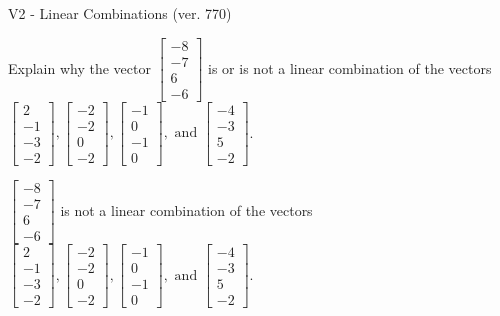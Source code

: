\begin{exercise}
  \begin{exerciseTitle}V2 - Linear Combinations (ver. 770)\end{exerciseTitle}
  \begin{exerciseStatement}
    Explain why the vector \(\left[\begin{array}{c}
-8 \\
-7 \\
6 \\
-6
\end{array}\right]\)  is or is not a linear 
	combination of the vectors \(\left[\begin{array}{c}
2 \\
-1 \\
-3 \\
-2
\end{array}\right] , \left[\begin{array}{c}
-2 \\
-2 \\
0 \\
-2
\end{array}\right] , \left[\begin{array}{c}
-1 \\
0 \\
-1 \\
0
\end{array}\right] , \text{ and } \left[\begin{array}{c}
-4 \\
-3 \\
5 \\
-2
\end{array}\right]\).
	


  \end{exerciseStatement}
  \begin{exerciseAnswer}
   \(\left[\begin{array}{c}
-8 \\
-7 \\
6 \\
-6
\end{array}\right]\) 
  	 is not  
	a linear combination of the vectors \(\left[\begin{array}{c}
2 \\
-1 \\
-3 \\
-2
\end{array}\right] , \left[\begin{array}{c}
-2 \\
-2 \\
0 \\
-2
\end{array}\right] , \left[\begin{array}{c}
-1 \\
0 \\
-1 \\
0
\end{array}\right] , \text{ and } \left[\begin{array}{c}
-4 \\
-3 \\
5 \\
-2
\end{array}\right]\).


\end{exerciseAnswer}
\end{exercise}
